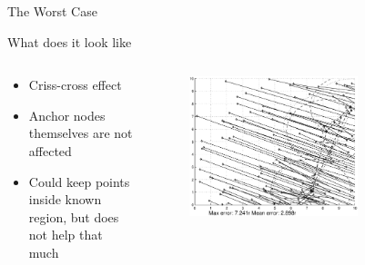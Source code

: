 \documentclass{beamer}
\begin{document}
\begin{frame}{The Worst Case}
\begin{block}{What does it look like}
\begin{columns}
	\begin{column}[T]{0.3\textwidth}
		\begin{itemize}
		\item Criss-cross effect
		\item Anchor nodes themselves are not affected
		\item Could keep points inside known region, but does not help that much
		\end{itemize}
		\vfill
	\end{column}
	\begin{column}[T]{0.7\textwidth}
		\begin{figure}
			\centering
				\includegraphics[width=0.7\textwidth]{AS6NetworkDiff9}
		\end{figure}
	\end{column}
\end{columns}
\end{block}
\end{frame}
\end{document}
